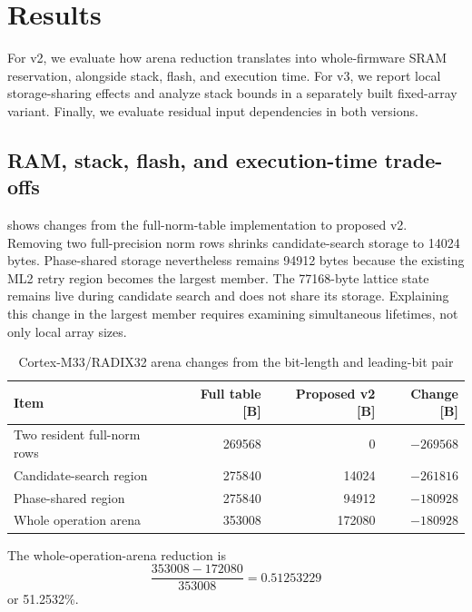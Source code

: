 \documentclass[a4paper,10pt]{article}
\theoremstyle{definition}
\theoremstyle{remark}
\begin{document}
\section{Results}
\label{sec:results}

For v2, we evaluate how arena reduction translates into whole-firmware SRAM reservation, alongside stack, flash, and execution time. For v3, we report local storage-sharing effects and analyze stack bounds in a separately built fixed-array variant. Finally, we evaluate residual input dependencies in both versions.

\subsection{RAM, stack, flash, and execution-time trade-offs}

 shows changes from the full-norm-table implementation to proposed v2. Removing two full-precision norm rows shrinks candidate-search storage to \num{14024} bytes. Phase-shared storage nevertheless remains \num{94912} bytes because the existing ML2 retry region becomes the largest member. The \num{77168}-byte lattice state remains live during candidate search and does not share its storage. Explaining this change in the largest member requires examining simultaneous lifetimes, not only local array sizes.

\begin{table}[H]
  \centering
  \caption{Cortex-M33/RADIX32 arena changes from the bit-length and leading-bit pair}
  \label{tab:sketch-arena}
  \small
  \begin{tabular}{@{}lrrr@{}}
    \toprule
    Item & Full table [B] & Proposed v2 [B] & Change [B] \\
    \midrule
    Two resident full-norm rows & \num{269568} & 0 & $-\num{269568}$ \\
    Candidate-search region & \num{275840} & \num{14024} & $-\num{261816}$ \\
    Phase-shared region & \num{275840} & \num{94912} & $-\num{180928}$ \\
    Whole operation arena & \num{353008} & \num{172080} & $-\num{180928}$ \\
    \bottomrule
  \end{tabular}
\end{table}

The whole-operation-arena reduction is
\begin{equation}
  \frac{\num{353008}-\num{172080}}{\num{353008}}
  =\num{0.51253229}
\end{equation}
or \num{51.2532}\%.
\end{document}
